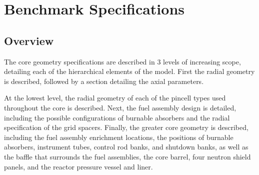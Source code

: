 \section{Benchmark Specifications}

\subsection{Overview}

The core geometry specifications are described in 3 levels of increasing scope,
detailing each of the hierarchical elements of the model. First the radial
geometry is described, followed by a section detailing the axial parameters.

At the lowest level, the radial geometry of each of the pincell types used
throughout the core is described. Next, the fuel assembly design is detailed, 
including the possible configurations of burnable absorbers and the radial
specification of the grid spacers. Finally, the greater core geometry is
described, including the fuel assembly enrichment locations, the positions of
burnable absorbers, instrument tubes, control rod banks, and shutdown banks, as
well as the baffle that surrounds the fuel assemblies, the core barrel, four
neutron shield panels, and the reactor pressure vessel and liner.

